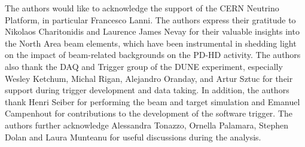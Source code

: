 The authors would like to acknowledge the support of the CERN Neutrino Platform, in particular Francesco Lanni. The authors express their gratitude to Nikolaos Charitonidis and Laurence James Nevay for their valuable insights into the North Area beam elements, which have been instrumental in shedding light on the impact of beam-related backgrounds on the PD-HD activity. The authors also thank the DAQ and Trigger group of the DUNE experiment, especially Wesley Ketchum, Michal Rigan, Alejandro Oranday, and Artur Sztuc for their support during trigger development and data taking. In addition, the authors thank Henri Seiber for performing the beam and target simulation and Emanuel Campenhout for contributions to the development of the software trigger. The authors further acknowledge Alessandra Tonazzo, Ornella Palamara, Stephen Dolan and Laura Munteanu for useful discussions during the analysis.
